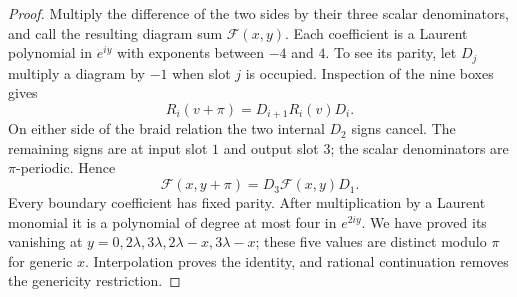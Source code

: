 \begin{proof}
Multiply the difference of the two sides by their three scalar
denominators, and call the resulting diagram sum $\mathcal F(x,y)$.
Each coefficient is a Laurent polynomial in $e^{iy}$ with exponents
between $-4$ and $4$. To see its parity, let $D_j$ multiply a diagram
by $-1$ when slot $j$ is occupied. Inspection of the nine boxes gives
\[
 R_i(v+\pi)=D_{i+1}R_i(v)D_i.
\]
On either side of the braid relation the two internal $D_2$ signs
cancel. The remaining signs are at input slot $1$ and output slot $3$;
the scalar denominators are $\pi$-periodic. Hence
\[
 \mathcal F(x,y+\pi)=D_3\mathcal F(x,y)D_1.
\]
Every boundary coefficient has fixed parity. After multiplication by
a Laurent monomial it is a polynomial of degree at most four in
$e^{2iy}$. We have proved its vanishing at
$y=0,2\lambda,3\lambda,2\lambda-x,3\lambda-x$; these five values
are distinct modulo $\pi$ for generic $x$. Interpolation proves the
identity, and rational continuation removes the genericity restriction.
\end{proof}
